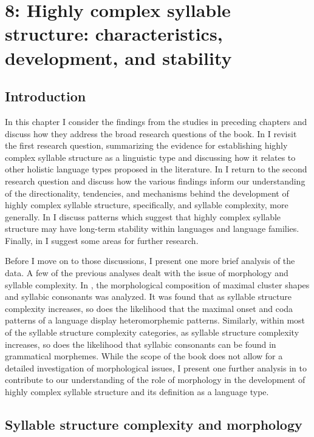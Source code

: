 \chapter{8: Highly complex syllable structure: characteristics, development, and stability}
\section{Introduction}\label{sec:8.1}

  In this chapter I consider the findings from the studies in preceding chapters and discuss how they address the broad research questions of the book. In  I revisit the first research question, summarizing the evidence for establishing highly complex syllable structure as a linguistic type and discussing how it relates to other holistic language types proposed in the literature. In  I return to the second research question and discuss how the various findings inform our understanding of the directionality, tendencies, and mechanisms behind the development of highly complex syllable structure, specifically, and syllable complexity, more generally. In  I discuss patterns which suggest that highly complex syllable structure may have long-term stability within languages and language families. Finally, in  I suggest some areas for further research.

  Before I move on to those discussions, I present one more brief analysis of the data. A few of the previous analyses dealt with the issue of morphology and syllable complexity. In  , the morphological composition of maximal cluster shapes and syllabic consonants was analyzed. It was found that as syllable structure complexity increases, so does the likelihood that the maximal onset and coda patterns of a language display heteromorphemic patterns. Similarly, within most of the syllable structure complexity categories, as syllable structure complexity increases, so does the likelihood that syllabic consonants can be found in grammatical morphemes. While the scope of the book does not allow for a detailed investigation of morphological issues, I present one further analysis in  to contribute to our understanding of the role of morphology in the development of highly complex syllable structure and its definition as a language type.

\section{Syllable structure complexity and morphology}\label{sec:8.2}

